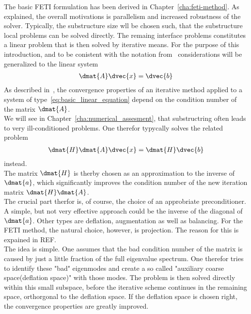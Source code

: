 The basic FETI formulation has been derived in Chapter~\ref{cha:feti-method}. As explained, the overall motivations is parallelism and increased robustness of the solver. Typically, the substructure size wll be chosen such, that the substructure local problems can be solved directly. The remaing interface problems constitutes a linear problem that is then solved by iterative means. For the purpose of this introduction, and to be conistent with the notation from~\cite{Spillane2016} considerations will be generalized to the linear system
\begin{align}
\dmat{A} \dvec{x} = \dvec{b}
\label{eq:basic_linear_equation}
\end{align}
As described in~\cite{Kaniel1966}\cite{Saad2003}, the convergence properties of an iterative method applied to a system of type~\eqref{eq:basic_linear_equation} depend on the condition number of the matrix $\dmat{A}$.\\
We will see in Chapter~\ref{cha:numerical_assesment}, that substructring often leads to very ill-conditioned problems. One therefor typycally solves the related problem
\begin{align}
\dmat{H}\dmat{A} \dvec{x} = \dmat{H}\dvec{b}
\label{eq:preconditioned_linear_equation}
\end{align}
instead.\\
The matrix $\dmat{H}$ is therby chosen as an approximation to the inverse of $\dmat{a}$, which significantly improves the condition number of the new iteration matrix $\dmat{H}\dmat{A}$.\\
The crucial part therfor is, of course, the choice of an approbriate preconditioner. A simple, but not very effective approach could be the inverse of the diagonal of $\dmat{a}$. Other types are deflation, augmentation as well as balancing. For the FETI method, the natural choice, however, is projection. The reason for this is expained in REF.\\
The idea is simple. One assumes that the bad condition number of the matrix is caused by just a little fraction of the full eigenvalue spectrum. One therefor tries to identify these "bad" eigenmodes and create a so called "auxiliary coarse space(deflation space)" with those modes. The problem is then solved directly within this small subspace, before the iterative scheme continues in the remaining space, orthorgonal to the deflation space. If the deflation space is chosen right, the convergence properties are greatly improved.\\

